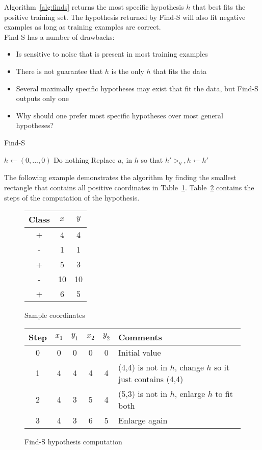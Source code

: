 \documentclass{report}
\begin{document}
Algorithm~\ref{alg:finds} returns the most specific hypothesis $h$ that best fits the positive training set. The hypothesis returned by Find-S will also fit negative examples as long as training examples are correct.
\\
Find-S has a number of drawbacks:
\begin{itemize}
\item Is sensitive to noise that is present in most training examples
\item There is not guarantee that $h$ is the only $h$ that fits the data
\item Several maximally specific hypotheses may exist that fit the data, but Find-S outputs only one
\item Why should one prefer most specific hypotheses over most general hypotheses?
\end{itemize}

\begin{algorithm}
\caption{Find-S}
\label{alg:finds}
\begin{algorithmic}
\State $h \gets (0,...,0)$ 
\State Do nothing
\Else
\State Replace $a_i$ in $h$ so that $h' >_g, h\gets h'$
\EndIf
\EndFor
\EndFor
\\
\end{algorithmic}
\end{algorithm}

The following example demonstrates the algorithm by finding the smallest rectangle that contains all positive coordinates in Table~\ref{table:coordinates}. Table~\ref{table:findscomputation} contains the steps of the computation of the hypothesis.

\begin{figure}[h!]
\centering
\begin{tabular}{c||c|c}
Class & $x$ & $y$ \\
\hline
\hline
+ & 4 & 4 \\
- & 1 & 1 \\
+ & 5 & 3 \\
- & 10 & 10 \\
+ & 6 & 5
\end{tabular}
\caption{Sample coordinates}
\label{table:coordinates}
\end{figure}


\begin{figure}[h!]
\centering
\begin{tabular}{c||c|c|c|c||l}
Step & $x_1$ & $y_1$ & $x_2$ & $y_2$ & Comments \\
\hline
\hline
0 & 0 & 0 & 0 & 0 & Initial value \\
1 & 4 & 4 & 4 & 4 & (4,4) is not in $h$, change $h$ so it just contains (4,4) \\
2 & 4 & 3 & 5 & 4 & (5,3) is not in $h$, enlarge $h$ to fit both \\
3 & 4 & 3 & 6 & 5 &  Enlarge again
\end{tabular}
\caption{Find-S hypothesis computation}
\label{table:findscomputation}
\end{figure}
\end{document}
